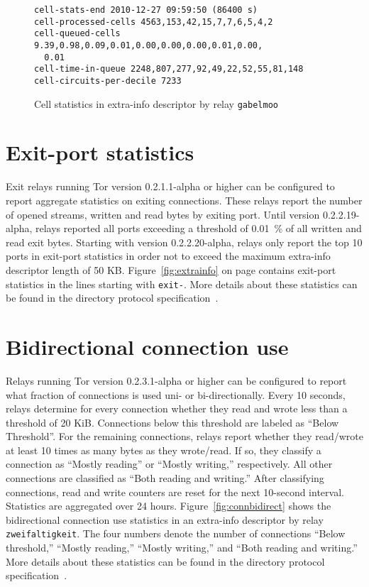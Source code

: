 \documentclass{article}
\begin{document}
\begin{figure}
\begin{verbatim}
cell-stats-end 2010-12-27 09:59:50 (86400 s)
cell-processed-cells 4563,153,42,15,7,7,6,5,4,2
cell-queued-cells 9.39,0.98,0.09,0.01,0.00,0.00,0.00,0.01,0.00,
  0.01
cell-time-in-queue 2248,807,277,92,49,22,52,55,81,148
cell-circuits-per-decile 7233
\end{verbatim}
\vspace{-1em}
\caption{Cell statistics in extra-info descriptor by relay
\texttt{gabelmoo}}
\label{fig:cellstats}
\end{figure}

\section{Exit-port statistics}

Exit relays running Tor version 0.2.1.1-alpha or higher can be configured
to report aggregate statistics on exiting connections.
These relays report the number of opened streams, written and read bytes
by exiting port.
Until version 0.2.2.19-alpha, relays reported all ports exceeding a
threshold of 0.01~\% of all written and read exit bytes.
Starting with version 0.2.2.20-alpha, relays only report the top 10 ports
in exit-port statistics in order not to exceed the maximum extra-info
descriptor length of 50 KB.
Figure~\ref{fig:extrainfo} on page \pageref{fig:extrainfo} contains
exit-port statistics in the lines starting with \verb+exit-+.
More details about these statistics can be found in the directory protocol
specification~\cite{dirspec}.

\section{Bidirectional connection use}
\label{sec:bidistats}

Relays running Tor version 0.2.3.1-alpha or higher can be configured to
report what fraction of connections is used uni- or bi-directionally.
Every 10 seconds, relays determine for every connection whether they read
and wrote less than a threshold of 20 KiB.
Connections below this threshold are labeled as ``Below Threshold''.
For the remaining connections, relays report whether they read/wrote at
least 10 times as many bytes as they wrote/read.
If so, they classify a connection as ``Mostly reading'' or ``Mostly
writing,'' respectively.
All other connections are classified as ``Both reading and writing.''
After classifying connections, read and write counters are reset for the
next 10-second interval.
Statistics are aggregated over 24 hours.
Figure~\ref{fig:connbidirect} shows the bidirectional connection use
statistics in an extra-info descriptor by relay \texttt{zweifaltigkeit}.
The four numbers denote the number of connections ``Below threshold,''
``Mostly reading,'' ``Mostly writing,'' and ``Both reading and writing.''
More details about these statistics can be found in the directory protocol
specification~\cite{dirspec}.
\end{document}
